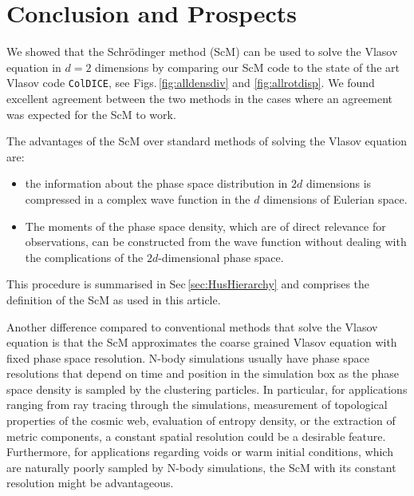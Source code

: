 \documentclass[twocolumn, nofootinbib, showpacs, superscriptaddress]{revtex4-1}
\begin{document}
\section{Conclusion and Prospects}\label{sec:conclusion}

We showed that the  Schr\"odinger method (ScM) can be used to solve the Vlasov equation in $d=2$ dimensions by comparing our ScM code 
 to the state of the art Vlasov code \texttt{ColDICE}, see Figs.\,\ref{fig:alldensdiv} and \ref{fig:allrotdisp}.
We found excellent agreement between the two methods in the cases where an agreement was expected for the ScM to work.

The advantages of the ScM over standard methods of solving the Vlasov equation are:
\begin{itemize}
 \item  the information about the phase space distribution in $2d$ dimensions is compressed in a complex wave function in the $d$ dimensions of Eulerian space. 
\item The moments of the phase space density, which are of direct relevance for observations, can be constructed from the wave function without dealing with the complications of the $2d$-dimensional phase space.
\end{itemize}
This procedure is summarised in Sec\,\eqref{sec:HusHierarchy} and comprises the definition of the ScM as used in this article.

Another difference compared to conventional methods that solve the Vlasov equation is that the ScM approximates the coarse 
grained Vlasov equation with fixed phase space resolution.
N-body simulations usually have phase space resolutions that depend on time and position in the simulation box as the phase space density is sampled by the clustering particles. 
In particular, for applications ranging from ray tracing through the simulations, measurement of topological properties of the cosmic web, evaluation of entropy density, or the extraction of metric components, a constant spatial resolution could be a desirable feature.
Furthermore, for applications regarding voids or warm initial conditions, which are naturally poorly sampled by N-body simulations, 
 the ScM with its constant resolution might be advantageous. 
\end{document}
